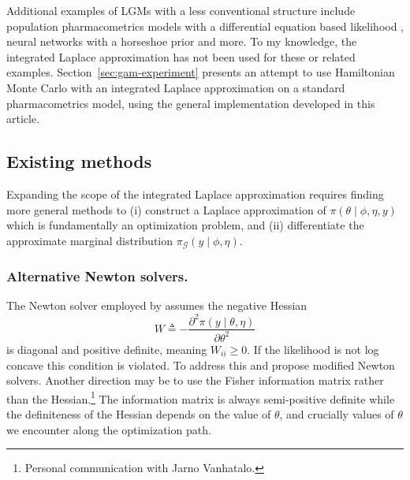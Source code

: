 \documentclass[stslayout, noinfoline]{imsart}
\theoremstyle{definition}
\begin{document}
Additional examples of LGMs with a less conventional structure include population pharmacometrics models with a differential equation based likelihood \citep[e.g][]{Gibaldi:1982, Gastonguay:2013, Margossian:2021-torsten}, neural networks with a horseshoe prior and more.
To my knowledge, the integrated Laplace approximation has not been used for these or related examples.
Section~\ref{sec:gam-experiment} presents an attempt to use Hamiltonian Monte Carlo with an integrated Laplace approximation on a standard pharmacometrics model,
using the general implementation developed in this article.

\subsection{Existing methods}

Expanding the scope of the integrated Laplace approximation requires finding more general methods to (i) construct a Laplace approximation of  $\pi(\theta \mid \phi, \eta, y)$
which is fundamentally an optimization problem,
and (ii) differentiate the approximate marginal distribution 
\mbox{$\pi_\mathcal{G}(y \mid \phi, \eta)$}.

\subsubsection{Alternative Newton solvers.}

The Newton solver employed by \citet{Rasmussen:2006} assumes the negative Hessian
\begin{equation*}
  W \triangleq - \frac{\partial^2 \pi(y \mid \theta, \eta)}{\partial \theta^2}
\end{equation*}
is diagonal and positive definite, meaning $W_{ii} \ge 0$.
If the likelihood is not log concave this condition is violated.
To address this \citet{Vanhatalo:2009} and \citet{Rasmussen:2010} propose modified Newton solvers.
Another direction may be to use the Fisher information matrix rather than the Hessian.\footnote{Personal communication with Jarno Vanhatalo.}
The information matrix is always semi-positive definite 
while the definiteness of the Hessian depends on the value of $\theta$,
and crucially values of $\theta$ we encounter along the optimization path.
\end{document}
